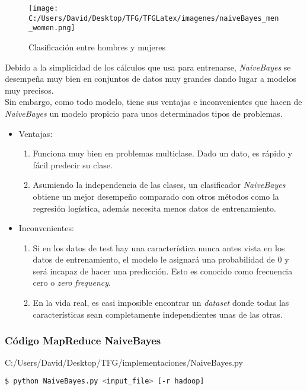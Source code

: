 \begin{figure}[!htpb]
  \centering
  \texttt{[image: C:/Users/David/Desktop/TFG/TFGLatex/imagenes/naiveBayes\_men\_women.png]}
  \caption[Naive Bayes clasificación]{Clasificación entre hombres y mujeres}
  \label{men_women_boundary}
\end{figure}

Debido a la simplicidad de los cálculos que usa para entrenarse, \textit{NaiveBayes} se desempeña muy bien 
en conjuntos de datos muy grandes dando lugar a modelos muy precisos.\\
Sin embargo, como todo modelo, tiene sus ventajas e inconvenientes que hacen de \textit{NaiveBayes} un modelo 
propicio para unos determinados tipos de problemas.

\clearpage

\begin{itemize}
  \item Ventajas:
  \begin{enumerate}
    \item Funciona muy bien en problemas multiclase. Dado un dato, es rápido y fácil predecir su clase.
    \item Asumiendo la independencia de las clases, un clasificador \textit{NaiveBayes} obtiene un mejor 
    desempeño comparado con otros métodos como la regresión logística, además necesita menos datos 
    de entrenamiento.
  \end{enumerate}
  \item Inconvenientes:
  \begin{enumerate}
    \item Si en los datos de test hay una característica nunca antes vista en los datos de 
    entrenamiento, el modelo le asignará una probabilidad de 0 y será incapaz de hacer una predicción.
    Esto es conocido como frecuencia cero o \textit{zero frequency}.
    \item En la vida real, es casi imposible encontrar un \textit{dataset} donde todas las características 
    sean completamente independientes unas de las otras.
  \end{enumerate}
\end{itemize}

\subsubsection*{Código MapReduce NaiveBayes}

                {C:/Users/David/Desktop/TFG/implementaciones/NaiveBayes.py}
                  
\begin{lstlisting}[language=bash, numbers=none]
$ python NaiveBayes.py <input_file> [-r hadoop]
\end{lstlisting}                
                    
\clearpage